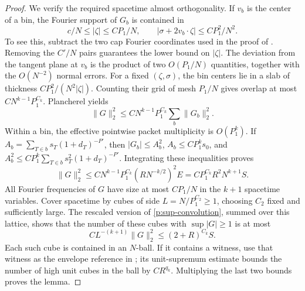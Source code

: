 \begin{proof}
We verify the required spacetime almost orthogonality.  If $v_b$ is the
center of a bin, the Fourier support of $G_b$ is contained in
\begin{equation}\label{p:off-diagonal-support}
 c/N\leq|\zeta|\leq CP_1/N,\qquad
 |\sigma+2v_b\cdot\zeta|\leq CP_1^2/N^2.
\end{equation}
To see this, subtract the two cap Fourier coordinates used in the proof
of .  Removing the $C'/N$ pairs guarantees the lower bound
on $|\zeta|$.  The deviation from the tangent plane at $v_b$ is the product
of two $O(P_1/N)$ quantities, together with the $O(N^{-2})$ normal errors.
For a fixed $(\zeta,\sigma)$, the bin centers lie in a slab of thickness
$CP_1^2/(N^2|\zeta|)$.  Counting their grid of mesh $P_1/N$ gives overlap
at most $CN^{k-1}P_1^{C_k}$.  Plancherel yields
\[
 \|G\|_2^2\leq C N^{k-1}P_1^{C_k}\sum_b\|G_b\|_2^2.
\]
Within a bin, the effective pointwise packet multiplicity is $O(P_1^k)$.
If $A_b=\sum_{T\in b}s_T(1+d_T)^{-P'}$, then
$|G_b|\leq A_b^2$, $A_b\leq CP_1^ks_0$, and
$A_b^2\leq CP_1^k\sum_{T\in b}s_T^2(1+d_T)^{-P'}$.
Integrating these inequalities proves
\begin{equation}\label{p:polynomial-L2}
 \|G\|_2^2
 \leq C N^{k-1}P_1^{C_k}(R N^{-k/2})^2E
 =C P_1^{C_k}R^2N^{k+1}S.
\end{equation}
All Fourier frequencies of $G$ have size at most $CP_1/N$ in the $k+1$
spacetime variables.  Cover spacetime by cubes of side
$L=N/P_1^{C_2}\geq1$, choosing $C_2$ fixed and sufficiently large.
The rescaled version of \eqref{p:sup-convolution}, summed over this lattice,
shows that the number of these cubes with $\sup|G|\geq1$ is at most
\[
 C L^{-(k+1)}\|G\|_2^2\leq (2+R)^{C_k}S.
\]
Each such cube is contained in an $N$-ball.  If it contains a witness, use
that witness as the envelope reference in ; its
unit-supremum estimate bounds the number of high unit cubes in the ball by
$C R^{q_k}$.  Multiplying the last two bounds proves the lemma.
\end{proof}

